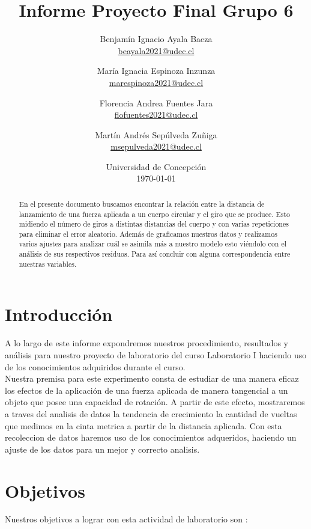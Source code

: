 \documentclass{article}
\title{Informe Proyecto Final Grupo 6}
\author{Benjam\'in Ignacio Ayala Baeza  \\ \href{mailto:beayala2021@udec.cl}{beayala2021@udec.cl} 
        \and Mar\'ia Ignacia Espinoza Inzunza \\ \href{mailto:marespinoza2021@udec.cl}{marespinoza2021@udec.cl} \\
        \and Florencia Andrea Fuentes Jara \\ \href{mailto:flofuentes2021@udec.cl}{flofuentes2021@udec.cl} \\
        \and Mart\'in Andrés Sepúlveda Zu\~niga \\ \href{mailto:msepulveda2021@udec.cl}{msepulveda2021@udec.cl} \\
\date{Universidad de Concepci\'on \\ \today}
}
\begin{document}
\maketitle

\begin{abstract}

En el presente documento buscamos encontrar la relación entre la distancia de lanzamiento de una fuerza aplicada a un cuerpo circular y el giro que se produce. Esto midiendo el número de giros a distintas distancias del cuerpo y con varias repeticiones para eliminar el error aleatorio. Además de graficamos nuestros datos y realizamos varios ajustes para analizar cuál se asimila más a nuestro modelo esto viéndolo con el análisis de sus respectivos residuos. Para así concluir con alguna correspondencia entre nuestras variables.

\end{abstract}

\section{Introducción} \label{intro}
 A lo largo de este informe expondremos nuestros procedimiento, resultados y análisis para nuestro proyecto de laboratorio del curso Laboratorio I haciendo uso de los conocimientos adquiridos durante el curso.\\
 Nuestra premisa para este experimento consta de estudiar de una manera eficaz los efectos de la aplicación de una fuerza aplicada de manera tangencial a un objeto que posee una capacidad de rotación. 
A partir de este efecto, mostraremos a traves del analisis de datos la tendencia de crecimiento la cantidad de vueltas que medimos en la cinta metrica a partir de la distancia aplicada. Con esta recoleccion de datos haremos uso de los conocimientos adqueridos, haciendo un ajuste de los datos para un mejor y correcto analisis. 




\section{Objetivos}
Nuestros objetivos a lograr con esta actividad de laboratorio son :
\end{document}
